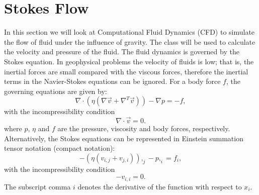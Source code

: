 
%
%
%

\section{Stokes Flow}
\label{STOKES FLOW CHAP}
In this section we will look at Computational Fluid Dynamics (CFD) to simulate
the flow of fluid under the influence of gravity.
The  class will be used to calculate the velocity
and pressure of the fluid.
The fluid dynamics is governed by the Stokes equation. In geophysical problems
the velocity of fluids is low; that is, the inertial forces are small compared
with the viscous forces, therefore the inertial terms in the Navier-Stokes
equations can be ignored.
For a body force $f$, the governing equations are given by:
%
\begin{equation}
\nabla \cdot (\eta(\nabla \vec{v} + \nabla^{T} \vec{v})) - \nabla p = -f,
\label{GENERAL NAVIER STOKES}
\end{equation}
%
with the incompressibility condition
%
\begin{equation}
\nabla \cdot \vec{v} = 0.
\label{INCOMPRESSIBILITY}
\end{equation}
%
where $p$, $\eta$ and $f$ are the pressure, viscosity and body forces, respectively.
Alternatively, the Stokes equations can be represented in Einstein summation
tensor notation (compact notation):
%
\begin{equation}
-(\eta(v_{i,j} + v_{j,i})),_{j} - p,_{i} = f_{i},
\label{GENERAL NAVIER STOKES COM}
\end{equation}
%
with the incompressibility condition
%
\begin{equation}
-v_{i,i} = 0.
\label{INCOMPRESSIBILITY COM}
\end{equation}
%
The subscript comma $i$ denotes the derivative of the function with respect to $x_{i}$.
%
